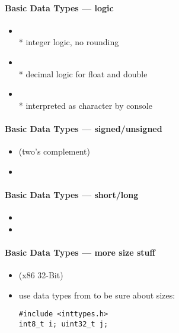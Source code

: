 \paragraph{Basic Data Types --- logic}
\begin{itemize}
  \item {} \\*
    integer logic, no rounding
  \item {} \\*
    decimal logic for float and double
  \item {} \\*
     interpreted as character by console
\end{itemize}

\paragraph{Basic Data Types --- signed/unsigned}
\begin{itemize}
  \item {} (two's complement)
  \item {}
\end{itemize}

\paragraph{Basic Data Types --- short/long}
\begin{itemize}
  \item {}
  \item {}
\end{itemize}

\paragraph{Basic Data Types --- more size stuff}
\begin{itemize}
  \item {} (x86 32-Bit)
  \item use data types from  to be sure about sizes:
  \begin{lstlisting}[style=customc]
#include <inttypes.h>
int8_t i; uint32_t j;
  \end{lstlisting}
\end{itemize}

